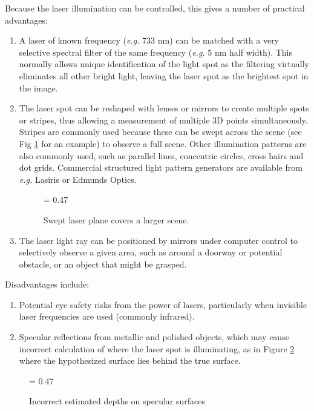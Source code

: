 \documentclass[twocolumn,oneside]{book}
\begin{document}
Because the laser illumination can be controlled, this gives a number
of practical advantages:
\begin{enumerate}

\item A laser of known frequency ({\it e.g.} 733 nm) can be matched with
a very selective spectral filter of the same frequency ({\it e.g.} 5 
nm half width). This normally allows unique identification of the 
light spot as the filtering virtually eliminates all other bright
light, leaving the laser spot as the brightest spot in the image.

\item The laser spot can be reshaped with lenses or mirrors to create
multiple spots or stripes, thus allowing a measurement of multiple
3D points simultaneously. Stripes are commonly used because these can
be swept across the scene (see Fig \ref{swept} for an example) to observe a full
scene.
Other illumination patterns are also commonly used, such
as parallel lines, concentric circles, cross hairs and dot grids.
Commercial structured light pattern generators are available from
{\it e.g.} Lasiris or Edmunds Optics.

\begin{figure}[htb]
{\epsfxsize = 0.47\textwidth {}}
\caption{Swept laser plane covers a larger scene.
\label{swept}}
\end{figure}


\item The laser light ray can be positioned by mirrors under computer
control to selectively observe a given area, such as around a doorway
or potential obstacle, or an object that might be grasped.

\end{enumerate}



Disadvantages include:

\begin{enumerate}

\item Potential eye safety risks from the power of lasers, particularly
when invisible laser frequencies are used (commonly infrared).

\item Specular reflections from metallic and polished objects, which may cause
incorrect calculation of where the laser spot is illuminating, as in Figure 
\ref{specular} where the hypothesized surface lies behind the true surface.

\end{enumerate}
\begin{figure}
{\epsfxsize = 0.47\textwidth {}}
\caption{Incorrect estimated depths on specular surfaces
\label{specular}}
\end{figure}
\end{document}
